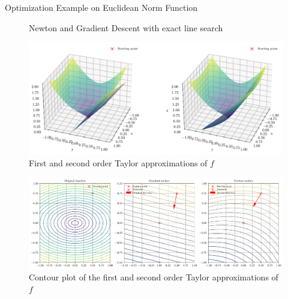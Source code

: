 \documentclass{beamer}
\begin{document}
\begin{frame}{Optimization Example on Euclidean Norm Function}
{\begin{figure}
            \caption{Newton and Gradient Descent
                with exact line search}
            \label{fig:newton_gd_exact_line_search}
        \end{figure}
    }
     {
        \begin{figure}
            \centering
            \includegraphics[width=1.0\textwidth]{plots/3d_newton_and_gradient_surface.pdf}
            \caption{First and second order Taylor approximations
                of $f$}
            \label{fig:3d_newton_gradient_surface}
        \end{figure}
    }
     {
        \begin{figure}
            \centering
            \includegraphics[width=1.0\textwidth]{plots/contour_newton_and_gradient_surface.pdf}
            \caption{Contour plot of the first and second order
                Taylor approximations of $f$}
            \label{fig:contour_newton_gradient_surface}
        \end{figure}
    }
\end{frame}
\end{document}
